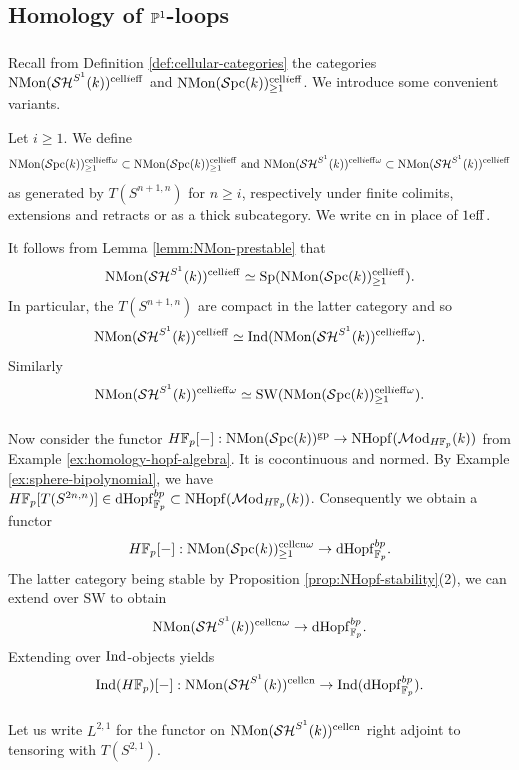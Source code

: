 \documentclass{amsart}
\numberwithin{proposition}{section}
\numberwithin{equation}{section}
\def\cell{\mathrm{cell}}
\def\NMon{\mathrm{NMon}}
\def\NHopf{\mathrm{NHopf}}
\def\dHopf{\mathrm{dHopf}}
\def\cn{\mathrm{cn}}
\newcommand{\Sp}{\mathrm{Sp}}
\newcommand{\SW}{\mathrm{SW}}
\def\hLoops{L}
\begin{document}
\subsection{Homology of $\P^1$-loops} \label{subsec:P1-loops}
\subsubsection{}
Recall from Definition \ref{def:cellular-categories} the categories $\NMon(\SH^{S^1}(k))^{\cell i \eff}$ and $\NMon(\Spc(k))^{\cell i \eff}_{\ge 1}$.
We introduce some convenient variants.

\begin{definition}
Let $i \ge 1$.
We define \[ \NMon(\Spc(k))^{\cell i \eff \omega}_{\ge 1} \subset \NMon(\Spc(k))^{\cell i \eff}_{\ge 1} \text{ and } \NMon(\SH^{S^1}(k))^{\cell i \eff \omega} \subset \NMon(\SH^{S^1}(k))^{\cell i \eff} \] as generated by $T(S^{n+1,n})$ for $n \ge i$, respectively
under finite colimits, extensions and retracts or as a thick subcategory.
We write $\cn$ in place of $1\eff$.
\end{definition}
It follows from Lemma \ref{lemm:NMon-prestable} that \[ \NMon(\SH^{S^1}(k))^{\cell i \eff} \wequi \Sp(\NMon(\Spc(k))^{\cell i \eff}_{\ge 1}). \]
In particular, the $T(S^{n+1,n})$ are compact in the latter category and so \cite[\S5.5.7]{lurie-htt} \[ \NMon(\SH^{S^1}(k))^{\cell i \eff} \wequi \Ind(\NMon(\SH^{S^1}(k))^{\cell i \eff \omega}). \]
Similarly \[ \NMon(\SH^{S^1}(k))^{\cell i \eff \omega} \wequi \SW(\NMon(\Spc(k))^{\cell i \eff \omega}_{\ge 1}). \]

\subsubsection{}
Now consider the functor $H\F_p[\ph]: \NMon(\Spc(k))^\gp \to \NHopf(\Mod_{H\F_p}(k))$ from Example \ref{ex:homology-hopf-algebra}.
It is cocontinuous and normed.
By Example \ref{ex:sphere-bipolynomial}, we have $H\F_p[T(S^{2n,n})] \in \dHopf_{\F_p}^{bp} \subset \NHopf(\Mod_{H\F_p}(k))$.
Consequently we obtain a functor \[ H\F_p[\ph]: \NMon(\Spc(k))^{\cell \cn \omega}_{\ge 1} \to \dHopf_{\F_p}^{bp}. \]
The latter category being stable by Proposition \ref{prop:NHopf-stability}(2), we can extend over $\SW$ to obtain \[ \NMon(\SH^{S^1}(k))^{\cell \cn \omega} \to \dHopf_{\F_p}^{bp}. \]
Extending over $\Ind$-objects yields \[ \Ind(H\F_p)[\ph]: \NMon(\SH^{S^1}(k))^{\cell\cn} \to \Ind(\dHopf_{\F_p}^{bp}). \]

\subsubsection{}
Let us write $\hLoops^{2,1}$ for the functor on $\NMon(\SH^{S^1}(k))^{\cell\cn}$ right adjoint to tensoring with $T(S^{2,1})$.
\end{document}
